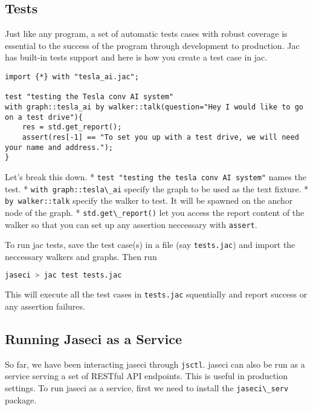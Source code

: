 \hypertarget{tests}{%
\subsection{Tests}\label{tests}}

Just like any program, a set of automatic tests cases with robust
coverage is essential to the success of the program through development
to production. Jac has built-in tests support and here is how you create
a test case in jac.

\begin{lstlisting}
import {*} with "tesla_ai.jac";

test "testing the Tesla conv AI system"
with graph::tesla_ai by walker::talk(question="Hey I would like to go on a test drive"){
    res = std.get_report();
    assert(res[-1] == "To set you up with a test drive, we will need your name and address.");
}
\end{lstlisting}

Let's break this down. *
\passthrough{\lstinline!test "testing the tesla conv AI system"!} names
the test. * \passthrough{\lstinline!with graph::tesla\_ai!} specify the
graph to be used as the text fixture. *
\passthrough{\lstinline!by walker::talk!} specify the walker to test. It
will be spawned on the anchor node of the graph. *
\passthrough{\lstinline!std.get\_report()!} let you access the report
content of the walker so that you can set up any assertion neccessary
with \passthrough{\lstinline!assert!}.

To run jac tests, save the test case(s) in a file (say
\passthrough{\lstinline!tests.jac!}) and import the neccessary walkers
and graphs. Then run

\begin{lstlisting}[language=bash]
jaseci > jac test tests.jac
\end{lstlisting}

This will execute all the test cases in
\passthrough{\lstinline!tests.jac!} squentially and report success or
any assertion failures.

\hypertarget{running-jaseci-as-a-service}{%
\subsection{Running Jaseci as a
Service}\label{running-jaseci-as-a-service}}

So far, we have been interacting jaseci through
\passthrough{\lstinline!jsctl!}. jaseci can also be run as a service
serving a set of RESTful API endpoints. This is useful in production
settings. To run jaseci as a service, first we need to install the
\passthrough{\lstinline!jaseci\_serv!} package.

